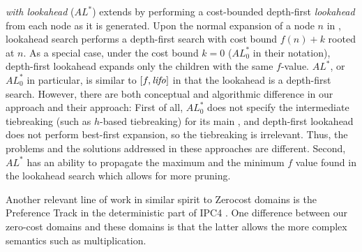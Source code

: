 \emph{\astar with lookahead} ($AL^*$) \cite{stern2010look} extends \astar by performing a cost-bounded depth-first \emph{lookahead} from each node as it is generated. Upon the normal expansion of a node $n$ in \astar, lookahead search performs a depth-first search with cost bound $f(n)+k$ rooted at $n$. As a special case, under the cost bound $k=0$ ($AL^*_0$ in their notation), depth-first lookahead expands only the children with the same $f$-value.
$AL^*$, or $AL^*_0$ in particular, is similar to $[f,{\text{\textit{lifo}}}]$ in that the lookahead is a depth-first search.
However, there are both conceptual and algorithmic difference in our approach and their approach:
First of all, $AL^*_0$ does not specify the intermediate tiebreaking (such as $h$-based tiebreaking) for its main \astar, and depth-first lookahead does not perform best-first expansion, so the tiebreaking is irrelevant. Thus, the problems and the solutions addressed in these approaches are different.
Second, $AL^*$ has an ability to propagate the maximum and the minimum $f$ value found in the lookahead search which allows for more pruning.

Another relevant line of work in similar spirit to Zerocost domains is the Preference Track in the deterministic
part of IPC4 \cite{gerevini2009automatically}. One difference between our zero-cost domains and these domains is
that the latter allows the more complex semantics such as multiplication.
